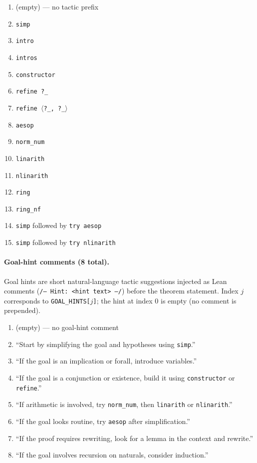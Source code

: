 \documentclass{article}
\begin{document}
\begin{enumerate}[start=0]
\item (empty) --- no tactic prefix
\item \texttt{simp}
\item \texttt{intro}
\item \texttt{intros}
\item \texttt{constructor}
\item \texttt{refine ?\_}
\item \texttt{refine \ensuremath{\langle}?\_,\,?\_\ensuremath{\rangle}}
\item \texttt{aesop}
\item \texttt{norm\_num}
\item \texttt{linarith}
\item \texttt{nlinarith}
\item \texttt{ring}
\item \texttt{ring\_nf}
\item \texttt{simp} followed by \texttt{try aesop}
\item \texttt{simp} followed by \texttt{try nlinarith}
\end{enumerate}

\paragraph{Goal-hint comments (8 total).}
Goal hints are short natural-language tactic suggestions injected as Lean comments (\texttt{/-- Hint: <hint text> --/}) before the theorem statement. Index $j$ corresponds to \texttt{GOAL\_HINTS[$j$]}; the hint at index 0 is empty (no comment is prepended).

\begin{enumerate}[start=0]
\item (empty) --- no goal-hint comment
\item ``Start by simplifying the goal and hypotheses using \texttt{simp}.''
\item ``If the goal is an implication or forall, introduce variables.''
\item ``If the goal is a conjunction or existence, build it using \texttt{constructor} or \texttt{refine}.''
\item ``If arithmetic is involved, try \texttt{norm\_num}, then \texttt{linarith} or \texttt{nlinarith}.''
\item ``If the goal looks routine, try \texttt{aesop} after simplification.''
\item ``If the proof requires rewriting, look for a lemma in the context and rewrite.''
\item ``If the goal involves recursion on naturals, consider induction.''
\end{enumerate}
\end{document}
